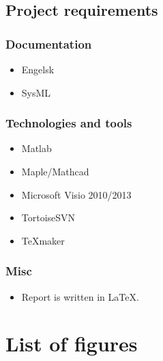 \subsection{Project requirements}

\subsubsection{Documentation}
\begin{itemize}
\item Engelsk
\item SysML
\end{itemize}

\subsubsection{Technologies and tools}
\begin{itemize}
\item Matlab
\item Maple/Mathcad
\item Microsoft Visio 2010/2013
\item TortoiseSVN
\item TeXmaker
\end{itemize}

\subsubsection{Misc}
\begin{itemize}
\item Report is written in LaTeX.
\end{itemize}

\section{List of figures}